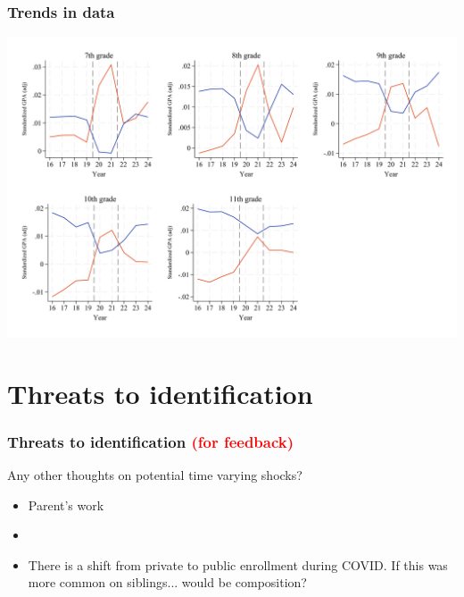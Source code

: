 \documentclass{beamer}
\begin{document}
\begin{frame}
    \label{frame:gpa_trends_grades_sec}
    \frametitle{Trends in data}
               \includegraphics[width=\textwidth]{./FIGURES/Descriptive/raw_grades_sec_std_gpa_m_adj_Tsiblings_Sall_Size2_4.pdf}    
          \hyperlink{frame:gpa_trends}{}
  
\end{frame}


\section{Threats to identification}

\begin{frame}
    \label{frame:research_feedback}
    \frametitle{Threats to identification \textcolor{red}{(for feedback)}}
        Any other thoughts on potential time varying shocks?
        \begin{itemize}
            \item Parent's work
            \item 
            \item There is a shift from private to public enrollment during COVID. If this was more common on siblings... would be composition?
        \end{itemize}

 
    \begin{flushleft}
        \hyperlink{frame:research}{}
    \end{flushleft}
    
\end{frame}
\end{document}
